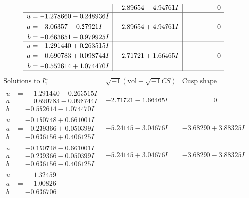 \documentclass[1p]{elsarticle_modified}
\theoremstyle{definition}
\newcommand{\I}{\sqrt{-1}}
\begin{document}
$$\begin{array}{c|c|c}
 & -2.89654 - 4.94761 I & \phantom{-0.000000 } 0 \\ \hline\begin{aligned}
u &= -1.278660 - 0.248936 I \\
a &= \phantom{-}3.06357 - 0.27921 I \\
b &= -0.663651 - 0.979925 I\end{aligned}
 & -2.89654 + 4.94761 I & \phantom{-0.000000 } 0 \\ \hline\begin{aligned}
u &= \phantom{-}1.291440 + 0.263515 I \\
a &= \phantom{-}0.690783 + 0.098744 I \\
b &= -0.552614 + 1.074470 I\end{aligned}
 & -2.71721 + 1.66465 I & \phantom{-0.000000 } 0\\
 \hline 
 \end{array}$$\newpage$$\begin{array}{c|c|c}  
\text{Solutions to }I^u_{1}& \I (\text{vol} + \sqrt{-1}CS) & \text{Cusp shape}\\
 \hline 
\begin{aligned}
u &= \phantom{-}1.291440 - 0.263515 I \\
a &= \phantom{-}0.690783 - 0.098744 I \\
b &= -0.552614 - 1.074470 I\end{aligned}
 & -2.71721 - 1.66465 I & \phantom{-0.000000 } 0 \\ \hline\begin{aligned}
u &= -0.150748 + 0.661001 I \\
a &= -0.239366 + 0.050399 I \\
b &= -0.636156 + 0.406125 I\end{aligned}
 & -5.24145 - 3.04676 I & -3.68290 + 3.88325 I \\ \hline\begin{aligned}
u &= -0.150748 - 0.661001 I \\
a &= -0.239366 - 0.050399 I \\
b &= -0.636156 - 0.406125 I\end{aligned}
 & -5.24145 + 3.04676 I & -3.68290 - 3.88325 I \\ \hline\begin{aligned}
u &= \phantom{-}1.32459\phantom{ +0.000000I} \\
a &= \phantom{-}1.00826\phantom{ +0.000000I} \\
b &= -0.636706\phantom{ +0.000000I}\end{aligned}

\end{array}$$
\end{document}
